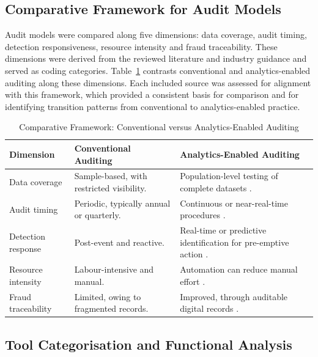 \documentclass[conference]{IEEEtran}
\begin{document}

\subsection{Comparative Framework for Audit Models}

Audit models were compared along five dimensions: data coverage, audit timing, detection responsiveness, resource intensity and fraud traceability. These dimensions were derived from the reviewed literature and industry guidance and served as coding categories. Table~\ref{tab:framework} contrasts conventional and analytics-enabled auditing along these dimensions. Each included source was assessed for alignment with this framework, which provided a consistent basis for comparison and for identifying transition patterns from conventional to analytics-enabled practice.

\begin{table}[!t]
\caption{Comparative Framework: Conventional versus Analytics-Enabled Auditing}
\label{tab:framework}
\centering
\footnotesize
\begin{tabular}{p{} p{} p{}}
\toprule
\textbf{Dimension} & \textbf{Conventional Auditing} & \textbf{Analytics-Enabled Auditing} \\
\midrule
Data coverage & Sample-based, with restricted visibility. & Population-level testing of complete datasets \cite{b22}. \\
Audit timing & Periodic, typically annual or quarterly. & Continuous or near-real-time procedures \cite{b23}. \\
Detection response & Post-event and reactive. & Real-time or predictive identification for pre-emptive action \cite{b24}. \\
Resource intensity & Labour-intensive and manual. & Automation can reduce manual effort \cite{b60}. \\
Fraud traceability & Limited, owing to fragmented records. & Improved, through auditable digital records \cite{b25}. \\
\bottomrule
\end{tabular}
\end{table}

\subsection{Tool Categorisation and Functional Analysis}
\end{document}
